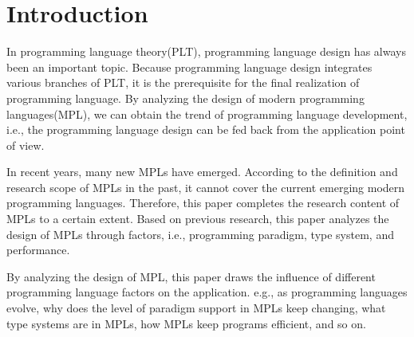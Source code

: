 \section{Introduction}

In programming language theory(PLT), programming language design has always been an important topic. Because programming language design integrates various branches of PLT, it is the prerequisite for the final realization of programming language. By analyzing the design of modern programming languages(MPL), we can obtain the trend of programming language development, i.e., the programming language design can be fed back from the application point of view.

In recent years, many new MPLs have emerged. According to the definition and research scope of MPLs in the past, it cannot cover the current emerging modern programming languages. Therefore, this paper completes the research content of MPLs to a certain extent. Based on previous research, this paper analyzes the design of MPLs through factors, i.e., programming paradigm, type system, and performance.

By analyzing the design of MPL, this paper draws the influence of different programming language factors on the application. e.g., as programming languages evolve, why does the level of paradigm support in MPLs keep changing, what type systems are in MPLs, how MPLs keep programs efficient, and so on.